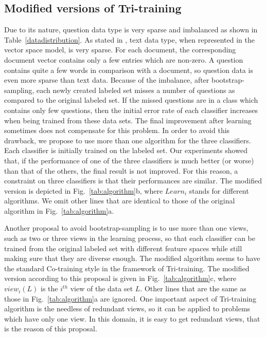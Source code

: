 \documentclass[english]{jnlp_1.4}
\begin{document}
\subsection{Modified versions of Tri-training}

Due to its nature, question data type is very sparse and
imbalanced as shown in Table~\ref{datadistribution}. As stated in
\cite{Thorsten1998}, text data type, when represented in the
vector space model, is very sparse. For each document, the
corresponding document vector contains only a few entries which
are non-zero. A question contains quite a few words in comparison
with a document, so question data is even more sparse than text
data. Because of the imbalance, after bootstrap-sampling, each
newly created labeled set misses a number of questions as compared
to the original labeled set. If the missed questions are in a
class which contains only few questions, then the initial error
rate of each classifier increases when being trained from these
data sets. The final improvement after learning sometimes does not
compensate for this problem. In order to avoid this drawback, we
propose to use more than one algorithm for the three classifiers.
Each classifier is initially trained on the labeled set. Our
experiments showed that, if the performance of one of the three
classifiers is much better (or worse) than that of the others, the
final result is not improved. For this reason, a constraint on
three classifiers is that their performances are similar. The
modified version is depicted in Fig.~\ref{tab:algorithm}b, where
$Learn_{i}$ stands for different algorithms. We omit other lines
that are identical to those of the original algorithm in
Fig.~\ref{tab:algorithm}a.

Another proposal to avoid bootstrap-sampling is to use more than one views, such as two or three views in the learning process, so that each classifier can be trained from the original labeled set with different feature spaces while still making sure that they are diverse enough. The modified algorithm seems to have the standard Co-training style in the framework of Tri-training. The modified version according to this proposal is given in Fig.~\ref{tab:algorithm}c, where $view_{i}(L)$ is the $i^{th}$ view of the data set $L$. Other lines that are the same as those in Fig.~\ref{tab:algorithm}a are ignored. One important aspect of Tri-training algorithm is the needless of redundant views, so it can be applied to problems which have only one view. In this domain, it is easy to get redundant views, that is the reason of this proposal.
\end{document}
